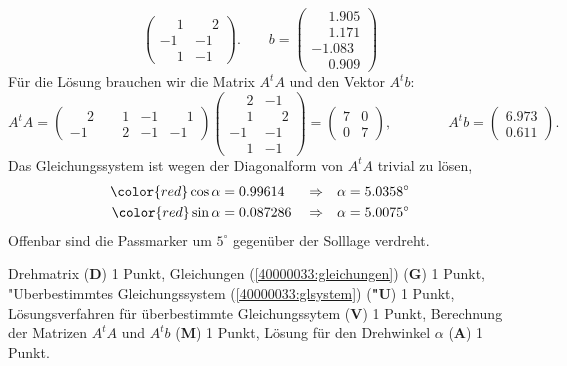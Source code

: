 \begin{loesung}
\[\begin{pmatrix}
\phantom{-}1&\phantom{-}2\\
         - 1&         - 1\\
\phantom{-}1&         - 1
\end{pmatrix}.
\qquad
b=
\begin{pmatrix}
\phantom{-}1.905\\
\phantom{-}1.171\\
         - 1.083\\
\phantom{-}0.909
\end{pmatrix}
\]
Für die Lösung brauchen wir die Matrix $A^tA$ und den Vektor $A^tb$:
\[
A^tA=
\begin{pmatrix}
\phantom{-}2&\phantom{-}1&-1&\phantom{-}1\\
         - 1&\phantom{-}2&-1&         - 1
\end{pmatrix}
\begin{pmatrix}
\phantom{-}2&         - 1\\
\phantom{-}1&\phantom{-}2\\
         - 1&         - 1\\
\phantom{-}1&         - 1
\end{pmatrix}
=
\begin{pmatrix}
7&0\\
0&7
\end{pmatrix},
\qquad
\qquad
A^tb
=
\begin{pmatrix}
6.973\\ 0.611
\end{pmatrix}.
\]
Das Gleichungssystem ist wegen der Diagonalform von $A^tA$ trivial zu lösen,
\begin{align*}
\color{red} \cos\alpha&=0.99614
&&\Rightarrow&\alpha&=5.0358^\circ
\\
\color{red} \sin\alpha&=0.087286
&&\Rightarrow&
\alpha&=5.0075^\circ
\end{align*}
Offenbar sind die Passmarker um $5^\circ$ gegenüber der Solllage verdreht.
\end{loesung}

\begin{bewertung}
Drehmatrix ({\bf D}) 1 Punkt,
Gleichungen (\ref{40000033:gleichungen}) ({\bf G}) 1 Punkt,
"Uberbestimmtes Gleichungssystem (\ref{40000033:glsystem}) ({\bf "U}) 1 Punkt,
Lösungsverfahren für überbestimmte Gleichungssytem ({\bf V}) 1 Punkt,
Berechnung der Matrizen $A^tA$ und $A^tb$ ({\bf M}) 1 Punkt,
Lösung für den Drehwinkel $\alpha$ ({\bf A}) 1 Punkt.
\end{bewertung}

